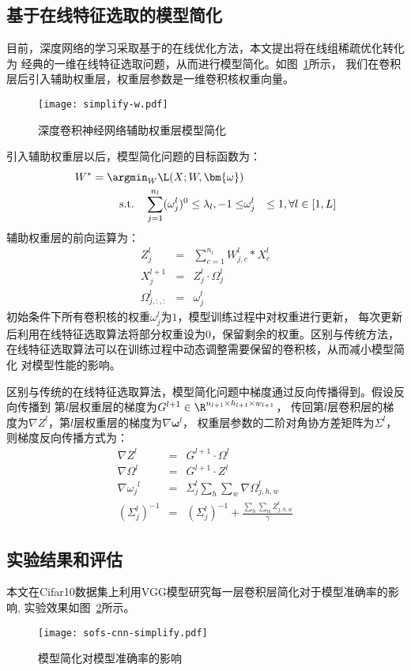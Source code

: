 \subsection{基于在线特征选取的模型简化}
目前，深度网络的学习采取基于的在线优化方法，本文提出将在线组稀疏优化转化为
经典的一维在线特征选取问题，从而进行模型简化。如图~\ref{fig:cnn-simplify-w}所示，
我们在卷积层后引入辅助权重层，权重层参数是一维卷积核权重向量。
\begin{figure}[ht]
    \center
    \texttt{[image: simplify-w.pdf]}
    \caption{深度卷积神经网络辅助权重层模型简化}
    \label{fig:cnn-simplify-w}
\end{figure}

引入辅助权重层以后，模型简化问题的目标函数为：
\begin{eqnarray}
    W^* = \argmin_{W} \L(X;W,\bm{\omega}) \\
    \text{s.t.} \quad
    \sum_{j=1}^{n_l}(\omega_j^l)^0 \leq \lambda_l,
    -1 \leq &\omega_j^l& \leq 1,
    \forall l \in [1,L]
\end{eqnarray}
辅助权重层的前向运算为：
\begin{eqnarray}
    Z_j^l &=& \sum_{c=1}^{n_l}{W_{j,c}^l \ast X_c^l} \\
    X_j^{l+1} &=& Z_j^l \cdot \Omega_j^l \\
    \Omega_{j,:,:}^l &=& \omega_j^l
\end{eqnarray}
初始条件下所有卷积核的权重$\omega_j^l$为$1$，模型训练过程中对权重进行更新，
每次更新后利用在线特征选取算法将部分权重设为$0$，保留剩余的权重。区别与传统方法，
在线特征选取算法可以在训练过程中动态调整需要保留的卷积核，从而减小模型简化
对模型性能的影响。

区别与传统的在线特征选取算法，模型简化问题中梯度通过反向传播得到。假设反向传播到
第$l$层权重层的梯度为$G^{l+1} \in \R^{n_{l+1} \times h_{l+1} \times w_{l+1}}$，
传回第$l$层卷积层的梯度为$\nabla Z^l$，第$l$层权重层的梯度为$\nabla\bm{\omega}^l$，
权重层参数的二阶对角协方差矩阵为$\Sigma^l$，则梯度反向传播方式为：
\begin{eqnarray}
    \nabla Z^l &=& G^{l+1} \cdot \Omega^l \\
    \nabla \Omega^l &=& G^{l+1} \cdot Z^l \\
    \nabla{\omega_j}^l &=& \Sigma^l_j\sum_h\sum_w\nabla \Omega^l_{j,h,w} \\
    (\Sigma^l_j)^{-1} &=& (\Sigma^l_j)^{-1}  + \frac{\sum_h\sum_w Z^l_{j,h,w}}{\gamma}
\end{eqnarray}

\subsection{实验结果和评估}
本文在Cifar10数据集上利用VGG模型研究每一层卷积层简化对于模型准确率的影响,
实验效果如图~\ref{fig:sofs-cnn-simplify}所示。
\begin{figure}[ht]
    \center
    \texttt{[image: sofs-cnn-simplify.pdf]}
    \caption{模型简化对模型准确率的影响}
    \label{fig:sofs-cnn-simplify}
\end{figure}

